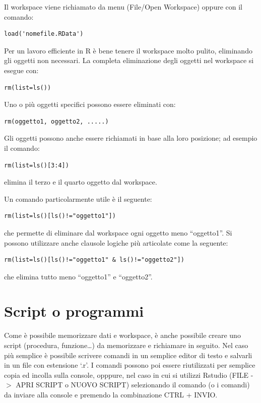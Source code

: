 \documentclass[a4paper,12pt,oneside]{book}
\theoremstyle{definition}
\theoremstyle{definition}
\theoremstyle{definition}
\theoremstyle{remark}
\begin{document}
Il workspace viene richiamato da menu (File/Open Workspace) oppure con
il comando:

\begin{verbatim}
load('nomefile.RData')
\end{verbatim}

Per un lavoro efficiente in R è bene tenere il workspace molto pulito,
eliminando gli oggetti non necessari. La completa eliminazione degli
oggetti nel workspace si esegue con:

\begin{verbatim}
rm(list=ls())
\end{verbatim}

Uno o più oggetti specifici possono essere eliminati con:

\begin{verbatim}
rm(oggetto1, oggetto2, .....)
\end{verbatim}

Gli oggetti possono anche essere richiamati in base alla loro posizione;
ad esempio il comando:

\begin{verbatim}
rm(list=ls()[3:4])
\end{verbatim}

elimina il terzo e il quarto oggetto dal workspace.

Un comando particolarmente utile è il seguente:

\begin{verbatim}
rm(list=ls()[ls()!="oggetto1"])
\end{verbatim}

che permette di eliminare dal workspace ogni oggetto meno ``oggetto1''.
Si possono utilizzare anche clausole logiche più articolate come la
seguente:

\begin{verbatim}
rm(list=ls()[ls()!="oggetto1" & ls()!="oggetto2"])
\end{verbatim}

che elimina tutto meno ``oggetto1'' e ``oggetto2''.

\section*{Script o programmi}\label{script-o-programmi}

Come è possibile memorizzare dati e workspace, è anche possibile creare
uno script (procedura, funzione\ldots{}) da memorizzare e richiamare in
seguito. Nel caso più semplice è possibile scrivere comandi in un
semplice editor di testo e salvarli in un file con estensione `.r'. I
comandi possono poi essere riutilizzati per semplice copia ed incolla
sulla console, opppure, nel caso in cui si utilizzi Rstudio (FILE -\(>\)
APRI SCRIPT o NUOVO SCRIPT) selezionando il comando (o i comandi) da
inviare alla console e premendo la combinazione CTRL + INVIO.
\end{document}
